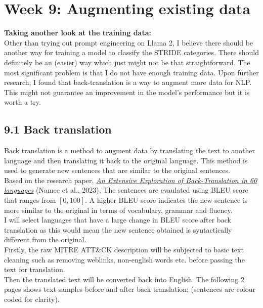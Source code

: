 \section*{Week 9: Augmenting existing data}

\textbf{Taking another look at the training data:} \\
Other than trying out prompt engineering on Llama 2, I believe there should be another way for training a model to classify the STRIDE categories.
There should definitely be an (easier) way which just might not be that straightforward.
The most significant problem is that I do not have enough training data. Upon further research, I found that back-translation is a way to augment more data for NLP. This might not guarantee an improvement in the model's performance but it is worth a try. 

\subsection*{9.1 Back translation}
Back translation is a method to augment data by translating the text to another language and then translating it back to the original language. This method is used to generate new sentences that are similar to the original sentences. \\
Based on the research paper, \href{https://aclanthology.org/2023.findings-acl.518.pdf}{\textit{An Extensive Exploration of Back-Translation in 60 languages}} (Namee et al., 2023), The sentences are evaulated using BLEU score that ranges from $[0, 100]$. A higher BLEU score indicates the new sentence is more similar to the original in terms of vocabulary, grammar and fluency. \\
I will select languages that have a large change in BLEU score after back translation as this would mean the new sentence obtained is syntactically different from the original. \\
\newline
Firstly, the raw MITRE ATT\&CK description will be subjected to basic text cleaning such as removing weblinks, non-english words etc. before passing the text for translation. \\
Then the translated text will be converted back into English. The following 2 pages shows text samples before and after back translation; (sentences are colour coded for clarity). \\

